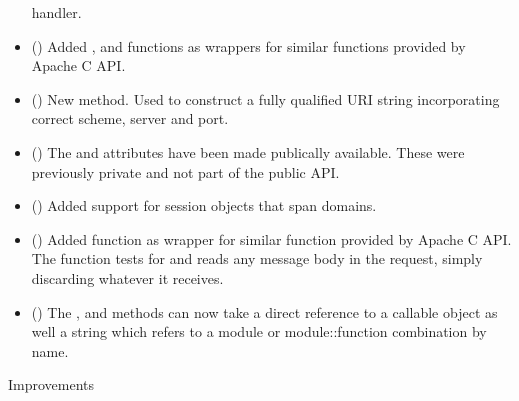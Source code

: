 \begin{itemize}
      handler.
    \item
      ()
      Added ,  and
       functions as wrappers for similar functions
      provided by Apache C API.
    \item
      ()
      New  method. Used to construct a fully
      qualified URI string incorporating correct scheme, server and port.
    \item
      ()
      The  and  attributes
      have been made publically available. These were previously private and
      not part of the public API.
    \item
      ()
      Added support for session objects that span domains.
    \item
      ()
      Added  function as wrapper for
      similar function provided by Apache C API. The function tests for
      and reads any message body in the request, simply discarding
      whatever it receives.
    \item
      ()
      The ,  and
       methods can now take a direct
      reference to a callable object as well a string which refers to a
      module or module::function combination by name.
  \end{itemize}

  Improvements
  
